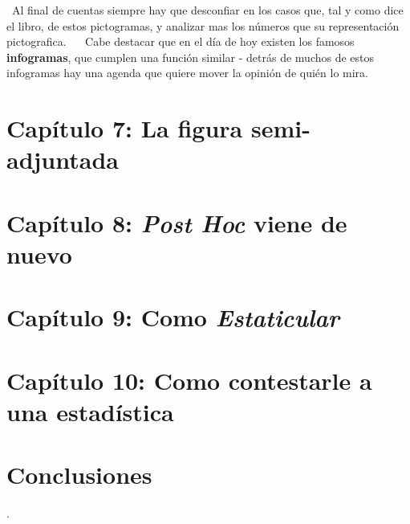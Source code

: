 \documentclass[a4paper, 11pt]{article}
\begin{document}
 Al final de cuentas siempre hay que desconfiar en los casos que, tal y como dice el libro, de estos pictogramas, y analizar mas los números que su representación pictografica.
 
 Cabe destacar que en el día de hoy existen los famosos \textbf{infogramas}, que cumplen una función similar - detrás de muchos de estos infogramas hay una agenda que quiere mover la opinión de quién lo mira. 
 
 \section*{Capítulo 7: La figura semi-adjuntada}

\section*{Capítulo 8: \textit{Post Hoc} viene de nuevo}

\section*{Capítulo 9: Como \textit{Estaticular}}

\section*{Capítulo 10: Como contestarle a una estadística}

\section*{Conclusiones}

.

\end{document}
